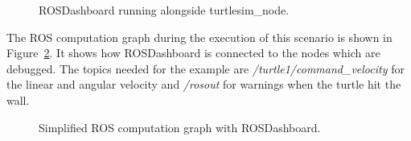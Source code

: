 \begin{figure}[thpb]
  \centering
  \caption{ROSDashboard running alongside turtlesim\_node.}
  \label{showcase}
\end{figure}

The ROS computation graph during the execution of this scenario is shown in Figure~\ref{rosgraph_simple}. It shows how ROSDashboard is connected to the nodes which are debugged. The topics needed for the example are \emph{/turtle1/command\_velocity} for the linear and angular velocity and \emph{/rosout} for warnings when the turtle hit the wall.

\begin{figure}[thpb]
  \centering
  \caption{Simplified ROS computation graph with ROSDashboard.}
  \label{rosgraph_simple}
\end{figure}

